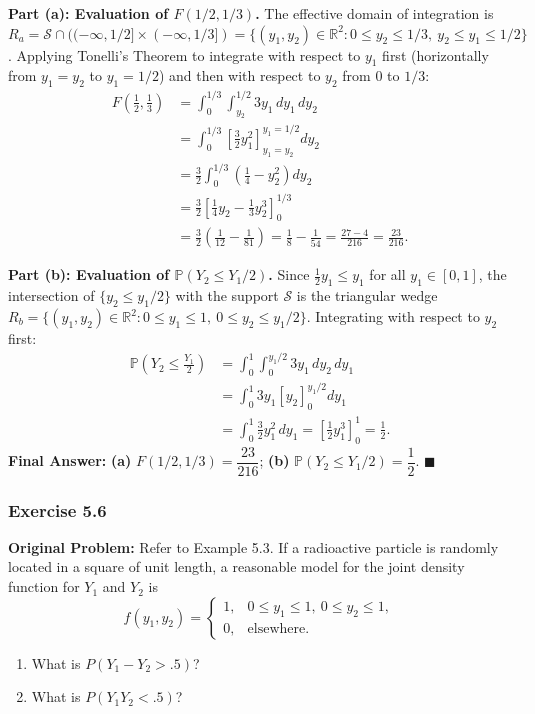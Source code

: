 \documentclass[11pt, letterpaper]{article}
\theoremstyle{definition}
\theoremstyle{remark}
\begin{document}
\textbf{Part (a): Evaluation of $F(1/2, 1/3)$.}
The effective domain of integration is $R_a = \mathcal{S} \cap ((-\infty, 1/2] \times (-\infty, 1/3]) = \{(y_1, y_2) \in \mathbb{R}^2 : 0 \le y_2 \le 1/3,\ y_2 \le y_1 \le 1/2\}$. Applying Tonelli's Theorem to integrate with respect to $y_1$ first (horizontally from $y_1 = y_2$ to $y_1 = 1/2$) and then with respect to $y_2$ from $0$ to $1/3$:
\begin{align*}
    F\!\left(\frac{1}{2}, \frac{1}{3}\right) &= \int_{0}^{1/3} \int_{y_2}^{1/2} 3y_1 \, dy_1 \, dy_2 \\
    &= \int_{0}^{1/3} \left[ \frac{3}{2} y_1^2 \right]_{y_1 = y_2}^{y_1 = 1/2} dy_2 \\
    &= \frac{3}{2} \int_{0}^{1/3} \left( \frac{1}{4} - y_2^2 \right) dy_2 \\
    &= \frac{3}{2} \left[ \frac{1}{4} y_2 - \frac{1}{3} y_2^3 \right]_{0}^{1/3} \\
    &= \frac{3}{2} \left( \frac{1}{12} - \frac{1}{81} \right) = \frac{1}{8} - \frac{1}{54} = \frac{27 - 4}{216} = \frac{23}{216}.
\end{align*}

\textbf{Part (b): Evaluation of $\mathbb{P}(Y_2 \le Y_1/2)$.}
Since $\frac{1}{2} y_1 \le y_1$ for all $y_1 \in [0, 1]$, the intersection of $\{y_2 \le y_1/2\}$ with the support $\mathcal{S}$ is the triangular wedge $R_b = \{(y_1, y_2) \in \mathbb{R}^2 : 0 \le y_1 \le 1,\ 0 \le y_2 \le y_1/2\}$. Integrating with respect to $y_2$ first:
\begin{align*}
    \mathbb{P}\!\left(Y_2 \le \frac{Y_1}{2}\right) &= \int_{0}^{1} \int_{0}^{y_1/2} 3y_1 \, dy_2 \, dy_1 \\
    &= \int_{0}^{1} 3y_1 \left[ y_2 \right]_{0}^{y_1/2} dy_1 \\
    &= \int_{0}^{1} \frac{3}{2} y_1^2 \, dy_1 = \left[ \frac{1}{2} y_1^3 \right]_{0}^{1} = \frac{1}{2}.
\end{align*}
\textbf{Final Answer:} \textbf{(a)} $F(1/2, 1/3) = \dfrac{23}{216}$; \quad \textbf{(b)} $\mathbb{P}(Y_2 \le Y_1/2) = \dfrac{1}{2}$. $\blacksquare$

\bigskip

\subsubsection*{Exercise 5.6}
\textbf{Original Problem:} Refer to Example 5.3. If a radioactive particle is randomly located in a square of unit length, a reasonable model for the joint density function for $Y_1$ and $Y_2$ is
\[
    f(y_1, y_2) = \begin{cases}
        1, & 0 \le y_1 \le 1,\ 0 \le y_2 \le 1, \\
        0, & \text{elsewhere.}
    \end{cases}
\]
\begin{enumerate}[label=\textbf{\alph*}]
    \item What is $P(Y_1 - Y_2 > .5)$?
    \item What is $P(Y_1 Y_2 < .5)$?
\end{enumerate}
\end{document}
